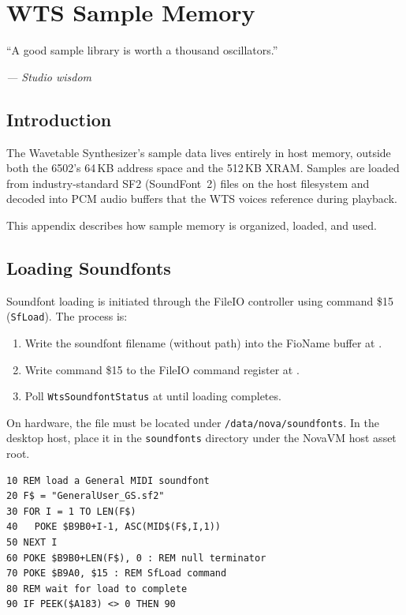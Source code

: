 \chapter{WTS Sample Memory}

\epigraph{``A good sample library is worth a thousand oscillators.''}%
{\textit{--- Studio wisdom}}

\section*{Introduction}

The Wavetable Synthesizer's sample data lives entirely in host memory, outside
both the 6502's 64\,KB address space and the 512\,KB XRAM.  Samples are loaded
from industry-standard SF2 (SoundFont~2) files on the host filesystem and
decoded into PCM audio buffers that the WTS voices reference during playback.

This appendix describes how sample memory is organized, loaded, and used.


\section{Loading Soundfonts}
\label{sec:wts-loading}

Soundfont loading is initiated through the FileIO controller using command \$15
(\texttt{SfLoad}).  The process is:

\begin{enumerate}
  \item Write the soundfont filename (without path) into the FioName buffer at
        .
  \item Write command \$15 to the FileIO command register at .
  \item Poll \texttt{WtsSoundfontStatus} at  until loading completes.
\end{enumerate}

On hardware, the file must be located under \texttt{/data/nova/soundfonts}.  In
the desktop host, place it in the \texttt{soundfonts} directory under the NovaVM
host asset root.

\begin{lstlisting}
10 REM load a General MIDI soundfont
20 F$ = "GeneralUser_GS.sf2"
30 FOR I = 1 TO LEN(F$)
40   POKE $B9B0+I-1, ASC(MID$(F$,I,1))
50 NEXT I
60 POKE $B9B0+LEN(F$), 0 : REM null terminator
70 POKE $B9A0, $15 : REM SfLoad command
80 REM wait for load to complete
90 IF PEEK($A183) <> 0 THEN 90
\end{lstlisting}

